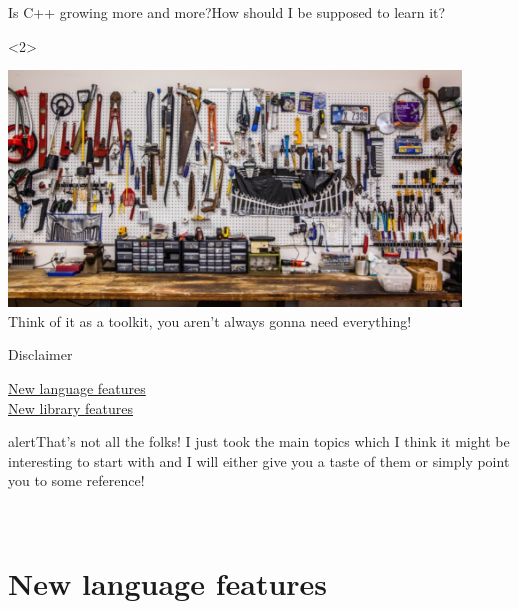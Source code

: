 \documentclass[usenames,dvipsnames,svgnames,14pt]{beamer}
\newif\ifAddLinkToTOC
\begin{document}
    \begin{frame}{Is C++ growing more and more?}{How should I be supposed to learn it?}
        \begin{uncoverenv}<2>
            \begin{center}
                \includegraphics[width=0.9\textwidth]{Toolkit}\\[1mm]
                Think of it as a toolkit, you aren't always gonna need everything!
            \end{center}
        \end{uncoverenv}
    \end{frame}
    \begin{frame}{Disclaimer}
        \vspace{-3mm}
        \centering
        \begin{center}
            \hyperlink{P1}{ New language features}\\[3mm]
            \hyperlink{P2}{ New library features}
        \end{center}
        \begin{varblock}{alert}{That's not all the folks!}
            I just took the main topics which I think it might be interesting to start with and I will either give you a taste of them or simply point you to some reference!
        \end{varblock}
        \bigskip
        \\[3mm]
    \end{frame}
    \label{P1}
    \AddLinkToTOCfalse
    \part{New language features}
    
    \label{P2}
    \AddLinkToTOCfalse
\end{document}
